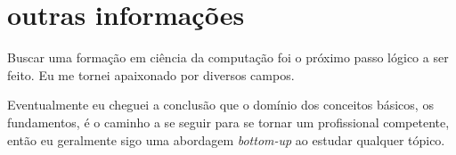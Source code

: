 \documentclass[]{../document-class/twentysecondcv}
\begin{document}
\section{outras informações}

Buscar uma formação em ciência da computação foi o próximo passo lógico a ser feito. Eu me tornei apaixonado por diversos campos.

Eventualmente eu cheguei a conclusão que o domínio dos conceitos básicos, os fundamentos, é o caminho a se seguir para se tornar um profissional competente, então eu geralmente sigo uma abordagem \textit{bottom-up} ao estudar qualquer tópico.
\end{document}
